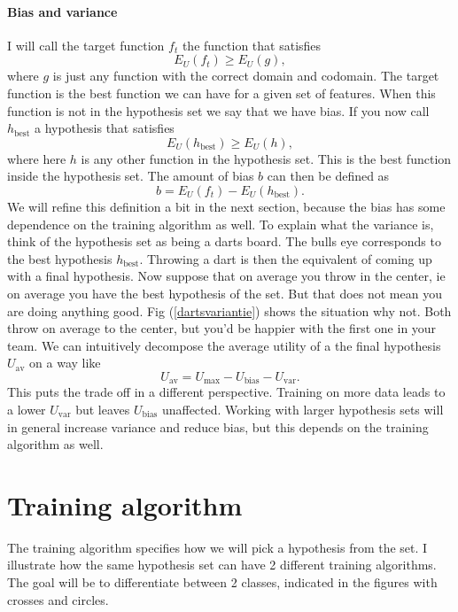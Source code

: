 \documentclass{report}
\theoremstyle{definition}
\begin{document}
\paragraph{Bias and variance}
I will call the target function $f_t$ the function that satisfies
\begin{equation}
E_{U}(f_t) \geq E_{U}(g),
\end{equation}
where $g$ is just any function with the correct domain and codomain. The target function is the best function we can have for a given set of features. When this function is not in the hypothesis set we say that we have bias. If you now call $h_{\text{best}}$ a hypothesis that satisfies
\begin{equation}
E_{U}(h_{\text{best}}) \geq E_{U}(h),
\end{equation}
where here $h$ is any other function in the hypothesis set. This is the best function inside the hypothesis set. The amount of bias $b$ can then be defined as
\begin{equation}
b = E_{U}(f_t) - E_{U}(h_{\text{best}}).
\end{equation}
We will refine this definition a bit in the next section, because the bias has some dependence on the training algorithm as well. To explain what the variance is, think of the hypothesis set as being a darts board. The bulls eye corresponds to the best hypothesis $h_{\text{best}}$. Throwing a dart is then the equivalent of coming up with a final hypothesis. Now suppose that on average you throw in the center, ie on average you have the best hypothesis of the set. But that does not mean you are doing anything good. Fig (\ref{dartsvariantie}) shows the situation why not. Both throw on average to the center, but you'd be happier with the first one in your team.
We can intuitively decompose the average utility of a the final hypothesis $U_{\text{av}}$ on a way like
\begin{equation}
U_{\text{av}} = U_{\text{max}} - U_{\text{bias}} - U_{\text{var}}.
\end{equation}
This puts the trade off in a different perspective. Training on more data leads to a lower $U_{\text{var}}$ but leaves $U_{\text{bias}}$ unaffected. Working with larger hypothesis sets will in general increase variance and reduce bias, but this depends on the training algorithm as well.  
	\section{Training algorithm}
The training algorithm specifies how we will pick a hypothesis from the set. I illustrate how the same hypothesis set can have 2 different training algorithms. The goal will be to differentiate between 2 classes, indicated in the figures with crosses and circles. 
\end{document}
